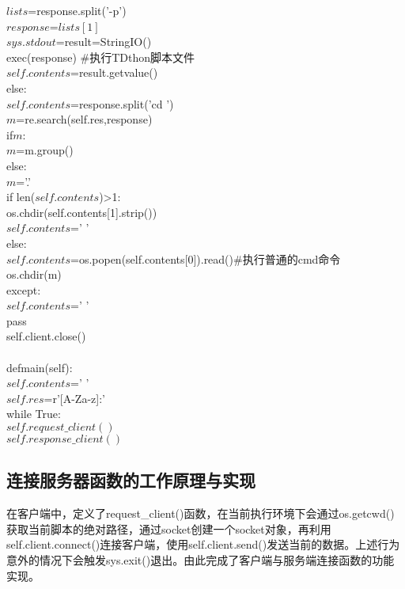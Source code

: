 \begin{breakablealgorithm}
\begin{algorithmic}[1]
\qquad \qquad \qquad $lists$=response.split('-p')\\
\qquad \qquad \qquad $response$=$lists[1]$\\
\qquad \qquad \qquad $sys.stdout$=result=StringIO()\\
\qquad \qquad \qquad exec(response)                      \qquad \#执行TDthon脚本文件\\
\qquad \qquad \qquad $self.contents$=result.getvalue()\\
\qquad \qquad \quad else:\\
\qquad \qquad \qquad $self.contents$=response.split('cd ')\\
\qquad \qquad \qquad $m$=re.search(self.res,response)\\
\qquad \qquad \qquad if\quad  $m$:\\
\qquad \qquad \qquad \quad $m$=m.group()\\
\qquad \qquad \qquad else:\\
\qquad \qquad \qquad \quad $m$='.'\\
\qquad \qquad \qquad if \quad len($self.contents$)>1:\\
\qquad \qquad \qquad \quad os.chdir(self.contents[1].strip())\\
\qquad \qquad \qquad \quad $self.contents$=' '\\
\qquad \qquad \qquad else:\\
\qquad \qquad \qquad \quad $self.contents$=os.popen(self.contents[0]).read()\#执行普通的cmd命令\\
\qquad \qquad \qquad \quad os.chdir(m)\\
\qquad \qquad except:\\
\qquad \qquad \quad $self.contents$=' '\\
\qquad \qquad \quad pass\\
\qquad \qquad self.client.close()\\
\\

\quad def\quad  main(self):\\
\qquad $self.contents$=' '\\
\qquad $self.res$=r'[A-Za-z]:'\\
\quad while True:\\
\qquad $self.request\_client()$\\
\qquad $self.response\_client()$		
	\end{algorithmic}
\end{breakablealgorithm}
\subsection{连接服务器函数的工作原理与实现}
在客户端中，定义了request\_client()函数，在当前执行环境下会通过os.getcwd()获取当前脚本的绝对路径，通过socket创建一个socket对象，再利用self.client.connect()连接客户端，使用self.client.send()发送当前的数据。上述行为意外的情况下会触发sys.exit()退出。由此完成了客户端与服务端连接函数的功能实现。
